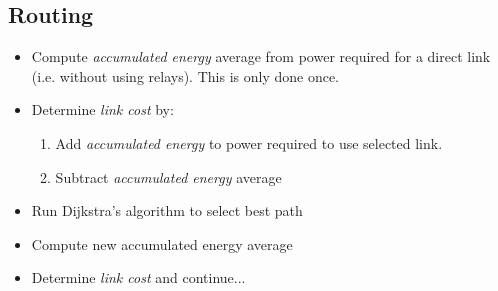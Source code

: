 \documentclass{article}
\begin{document}
\subsection{Routing}
\begin{itemize}
\item Compute \emph{accumulated energy} average from power required for a direct link (i.e. without using relays). This is only done once.

\item Determine \emph{link cost} by:
\begin{enumerate}
\item Add \emph{accumulated energy} to power required to use selected link.
\item Subtract \emph{accumulated energy} average
\end{enumerate}

\item Run Dijkstra's algorithm to select best path

\item Compute new accumulated energy average

\item Determine  \emph{link cost} and continue...

\end{itemize}

%
%

\end{document}
